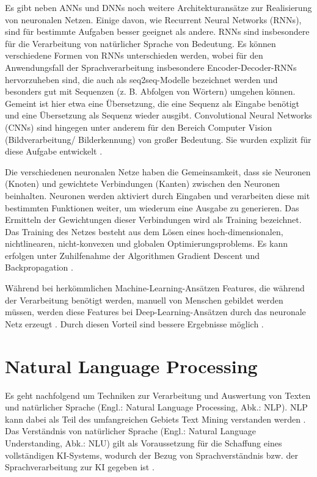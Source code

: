 Es gibt neben ANNs und DNNs noch weitere Architekturansätze zur Realisierung von neuronalen Netzen. Einige davon, wie Recurrent Neural Networks (RNNs), sind für bestimmte Aufgaben besser geeignet als andere. RNNs sind insbesondere für die Verarbeitung von natürlicher Sprache von Bedeutung. Es können verschiedene Formen von RNNs unterschieden werden, wobei für den Anwendungsfall der Sprachverarbeitung insbesondere Encoder-Decoder-RNNs hervorzuheben sind, die auch als seq2seq-Modelle bezeichnet werden und besonders gut mit Sequenzen (z. B. Abfolgen von Wörtern) umgehen können. Gemeint ist hier etwa eine Übersetzung, die eine Sequenz als Eingabe benötigt und eine Übersetzung als Sequenz wieder ausgibt. \cite[23-28]{White} Convolutional Neural Networks (CNNs) sind hingegen unter anderem für den Bereich Computer Vision (Bildverarbeitung/ Bilderkennung) von großer Bedeutung. Sie wurden explizit für diese Aufgabe entwickelt \cite[]{LeCun}.

Die verschiedenen neuronalen Netze haben die Gemeinsamkeit, dass sie Neuronen (Knoten) und gewichtete Verbindungen (Kanten) zwischen den Neuronen beinhalten. Neuronen werden aktiviert durch Eingaben und verarbeiten diese mit bestimmten Funktionen weiter, um wiederum eine Ausgabe zu generieren. Das Ermitteln der Gewichtungen dieser Verbindungen wird als Training bezeichnet. Das Training des Netzes besteht aus dem Lösen eines hoch-dimensionalen, nichtlinearen, nicht-konvexen und globalen Optimierungsproblems. Es kann erfolgen unter Zuhilfenahme der Algorithmen Gradient Descent und Backpropagation \cite[1-13]{White}.

Während bei herkömmlichen Machine-Learning-Ansätzen Features, die während der Verarbeitung benötigt werden, manuell von Menschen gebildet werden müssen, werden diese Features bei Deep-Learning-Ansätzen durch das neuronale Netz erzeugt \cite[S. 3-4]{Alom}. Durch diesen Vorteil sind bessere Ergebnisse möglich \cite[S. 11]{Alom}.

\section{Natural Language Processing}

Es geht nachfolgend um Techniken zur Verarbeitung und Auswertung von Texten und natürlicher Sprache (Engl.: Natural Language Processing, Abk.: NLP).  NLP kann dabei als Teil des umfangreichen Gebiets Text Mining verstanden werden \cite[S. 17]{Perez}. Das Verständnis von natürlicher Sprache (Engl.: Natural Language Understanding, Abk.: NLU) gilt als Voraussetzung für die Schaffung eines vollständigen KI-Systems, wodurch der Bezug von Sprachverständnis bzw. der Sprachverarbeitung zur KI gegeben ist \cite[S. 8]{Yampolskiy}.

